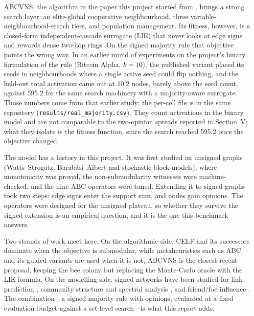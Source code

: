 \documentclass[journal,letterpaper,10pt]{IEEEtran}
\begin{document}
ABCVNS, the algorithm in the paper this project started from \cite{tang2026}, brings a strong search layer: an elite-global cooperative neighbourhood, three variable-neighbourhood-search tiers, and population management. Its fitness, however, is a closed-form independent-cascade surrogate (LIE) that never looks at edge signs and rewards dense two-hop rings. On the signed majority rule that objective points the wrong way. In an earlier round of experiments on the project's binary formulation of the rule (Bitcoin Alpha, $k=10$), the published variant placed its seeds in neighbourhoods where a single active seed could flip nothing, and the held-out total activation came out at 10.2 nodes, barely above the seed count, against 595.2 for the same search machinery with a majority-aware surrogate. Those numbers come from that earlier study; the per-cell file is in the same repository (\texttt{results/real\_majority.csv}). They count activations in the binary model and are not comparable to the two-opinion spreads reported in Section~V; what they isolate is the fitness function, since the search reached 595.2 once the objective changed.

The model has a history in this project. It was first studied on unsigned graphs (Watts--Strogatz, Barab\'asi--Albert and stochastic block models), where monotonicity was proved, the non-submodularity witnesses were machine-checked, and the nine ABC operators were tuned. Extending it to signed graphs took two steps: edge signs enter the support sum, and nodes gain opinions. The operators were designed for the unsigned plateau, so whether they survive the signed extension is an empirical question, and it is the one this benchmark answers.

Two strands of work meet here. On the algorithmic side, CELF and its successors \cite{kempe2003,leskovec2007} dominate when the objective is submodular, while metaheuristics such as ABC \cite{karaboga2005,karaboga2007} and its guided variants \cite{zhu2010,kiran2015,akay2012} are used when it is not; ABCVNS \cite{tang2026} is the closest recent proposal, keeping the bee colony but replacing the Monte-Carlo oracle with the LIE formula. On the modelling side, signed networks have been studied for link prediction \cite{leskovec2010,kumar2016}, community structure and spectral analysis \cite{kunegis2009,kunegis2010}, and friend/foe influence \cite{li2013}. The combination---a signed majority rule with opinions, evaluated at a fixed evaluation budget against a set-level search---is what this report adds.
\end{document}
